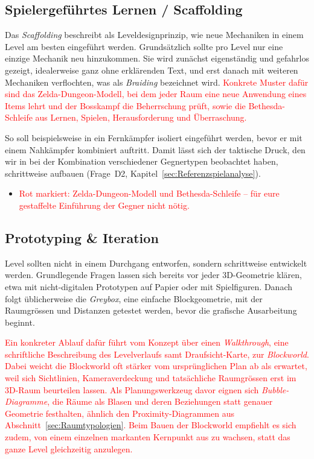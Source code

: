 \documentclass[../Main.tex]{subfiles}
\begin{document}
\subsection{Spielergeführtes Lernen / Scaffolding} \label{sec:Scaffolding}
Das \textit{Scaffolding} beschreibt als Leveldesignprinzip, wie neue Mechaniken in einem Level am besten eingeführt werden.\autocite[114]{totten2014architectural} Grundsätzlich sollte pro Level nur eine einzige Mechanik neu hinzukommen.\autocite{gdc_tenprinciples2010} Sie wird zunächst eigenständig und gefahrlos gezeigt, idealerweise ganz ohne erklärenden Text, und erst danach mit weiteren Mechaniken verflochten, was als \textit{Braiding} bezeichnet wird.\autocite{gdc_movingmountains2020} \textcolor{red}{Konkrete Muster dafür sind das Zelda-Dungeon-Modell, bei dem jeder Raum eine neue Anwendung eines Items lehrt und der Bosskampf die Beherrschung prüft, sowie die Bethesda-Schleife aus Lernen, Spielen, Herausforderung und Überraschung.\autocite{gdc_tenprinciples2010}}

So soll beispielsweise in  ein Fernkämpfer isoliert eingeführt werden, bevor er mit einem Nahkämpfer kombiniert auftritt. Damit lässt sich der taktische Druck, den wir in  bei der Kombination verschiedener Gegnertypen beobachtet haben, schrittweise aufbauen (Frage~D2, Kapitel~\ref{sec:Referenzspielanalyse}).

\begin{itemize}[leftmargin=1.5cm]
    \item \textcolor{red}{Rot markiert: Zelda-Dungeon-Modell und Bethesda-Schleife -- für eure gestaffelte Einführung der Gegner nicht nötig.}
\end{itemize}

\subsection{Prototyping \& Iteration} \label{sec:Prototyping}
Level sollten nicht in einem Durchgang entworfen, sondern schrittweise entwickelt werden. Grundlegende Fragen lassen sich bereits vor jeder 3D-Geometrie klären, etwa mit nicht-digitalen Prototypen auf Papier oder mit Spielfiguren. Danach folgt üblicherweise die \textit{Greybox}, eine einfache Blockgeometrie, mit der Raumgrössen und Distanzen getestet werden, bevor die grafische Ausarbeitung beginnt.\autocite[124--126]{totten2014architectural}

\textcolor{red}{Ein konkreter Ablauf dafür führt vom Konzept über einen \textit{Walkthrough}, eine schriftliche Beschreibung des Levelverlaufs samt Draufsicht-Karte, zur \textit{Blockworld}. Dabei weicht die Blockworld oft stärker vom ursprünglichen Plan ab als erwartet, weil sich Sichtlinien, Kameraverdeckung und tatsächliche Raumgrössen erst im 3D-Raum beurteilen lassen. Als Planungswerkzeug davor eignen sich \textit{Bubble-Diagramme}, die Räume als Blasen und deren Beziehungen statt genauer Geometrie festhalten, ähnlich den Proximity-Diagrammen aus Abschnitt~\ref{sec:Raumtypologien}. Beim Bauen der Blockworld empfiehlt es sich zudem, von einem einzelnen markanten Kernpunkt aus zu wachsen, statt das ganze Level gleichzeitig anzulegen.\autocite{gdc_leveldesignaday2020}}
\end{document}

